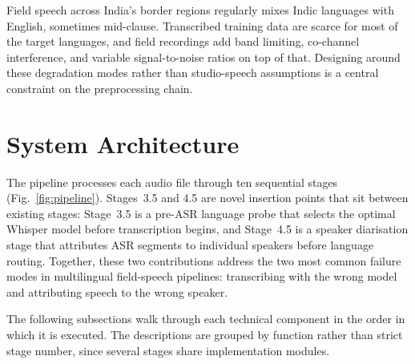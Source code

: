 \documentclass[conference]{IEEEtran}
\begin{document}
Field speech across India's border regions regularly mixes Indic languages with English, sometimes mid-clause. Transcribed training data are scarce for most of the target languages, and field recordings add band limiting, co-channel interference, and variable signal-to-noise ratios on top of that. Designing around these degradation modes rather than studio-speech assumptions is a central constraint on the preprocessing chain.

\section{System Architecture}
\label{sec:system}

The pipeline processes each audio file through ten sequential stages (Fig.~\ref{fig:pipeline}). Stages~3.5 and 4.5 are novel insertion points that sit between existing stages: Stage~3.5 is a pre-ASR language probe that selects the optimal Whisper model before transcription begins, and Stage~4.5 is a speaker diarisation stage that attributes ASR segments to individual speakers before language routing. Together, these two contributions address the two most common failure modes in multilingual field-speech pipelines: transcribing with the wrong model and attributing speech to the wrong speaker.

The following subsections walk through each technical component in the order in which it is executed. The descriptions are grouped by function rather than strict stage number, since several stages share implementation modules.
\end{document}
